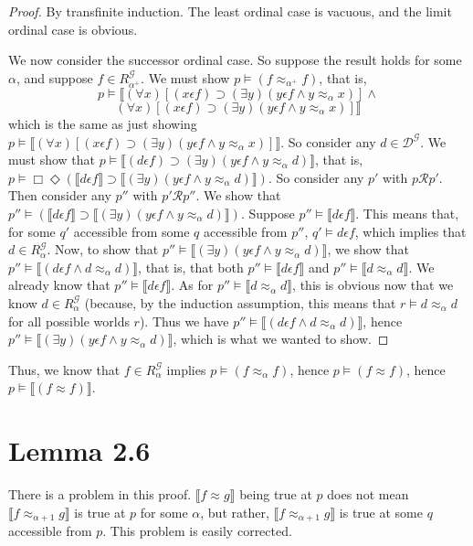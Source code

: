 \documentclass{article}
\newcommand{\lbc}{\llbracket}
\newcommand{\rbc}{\rrbracket}
\theoremstyle{definition}
\begin{document}
\begin{proof}
By transfinite induction. The least ordinal case is vacuous, and the limit ordinal case is obvious.

We now consider the successor ordinal case. So suppose the result holds for some $\alpha$, and 
suppose $f\in R^\mathcal{G}_{\alpha^+}$. We must show $p\vDash (f\approx_{\alpha^+} f)$, that is,
\[ p\vDash\lbc(\forall x)[(x\epsilon f)\supset(\exists y)(y\epsilon f\wedge y\approx_\alpha x)]\wedge \]
\[ (\forall x)[(x\epsilon f)\supset(\exists y)(y\epsilon f\wedge y\approx_\alpha x)]\rbc \]
which is the same as just showing
$p\vDash\lbc(\forall x)[(x\epsilon f)\supset(\exists y)(y\epsilon f\wedge y\approx_\alpha x)]\rbc$. So consider any 
$d\in\mathcal{D}^\mathcal{G}$. We must show that 
$p\vDash\lbc(d\epsilon f)\supset(\exists y)(y\epsilon f\wedge y\approx_\alpha d)\rbc$, that is, 
$p\vDash\Box\Diamond(\lbc d\epsilon f\rbc\supset\lbc(\exists y)(y\epsilon f\wedge y\approx_\alpha d)\rbc)$. So consider any 
$p'$ with $p\mathcal{R}p'$. Then consider any $p''$ with $p'\mathcal{R}p''$. We show that 
$p''\vDash(\lbc d\epsilon f\rbc\supset\lbc(\exists y)(y\epsilon f\wedge y\approx_\alpha d)\rbc)$.
Suppose $p''\vDash\lbc d\epsilon f\rbc$. This means 
that, for some $q'$ accessible from some $q$ accessible from $p''$, $q'\vDash d\epsilon f$, which implies 
that $d\in R^\mathcal{G}_\alpha$. Now, to show that $p''\vDash\lbc(\exists y)(y\epsilon f\wedge y\approx_\alpha d)\rbc$, we show 
that $p''\vDash\lbc (d\epsilon f\wedge d\approx_\alpha d)\rbc$, that is, that both 
$p''\vDash\lbc d\epsilon f\rbc$ and $p''\vDash\lbc d\approx_\alpha d\rbc$. We already know that 
$p''\vDash\lbc d\epsilon f\rbc$. As for $p''\vDash\lbc d\approx_\alpha d\rbc$, this is obvious now that we know 
$d\in R^\mathcal{G}_\alpha$ (because, by the induction assumption, this means that $r\vDash d\approx_\alpha d$ for all 
possible worlds $r$). Thus we have $p''\vDash\lbc (d\epsilon f\wedge d\approx_\alpha d)\rbc$, hence 
$p''\vDash\lbc(\exists y)(y\epsilon f\wedge y\approx_\alpha d)\rbc$, which is what we wanted to show.
\end{proof}

Thus, we know that $f\in R^\mathcal{G}_\alpha$ implies $p\vDash (f\approx_\alpha f)$, hence 
$p\vDash (f\approx f)$, hence $p\vDash\lbc (f\approx f)\rbc$.

\section*{Lemma 2.6}
There is a problem in this proof. $\lbc f\approx g\rbc$ being true at $p$ does not 
mean $\lbc f\approx_{\alpha+1} g\rbc$ is true at $p$ for some $\alpha$, but rather, 
$\lbc f\approx_{\alpha+1} g\rbc$ is true at some $q$ accessible from $p$. This problem is easily corrected.
 
\end{document}
